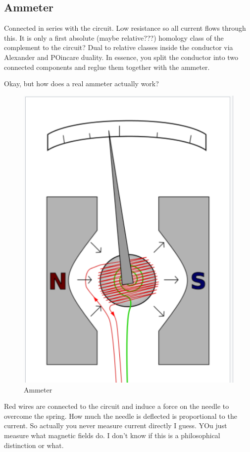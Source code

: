 \documentclass{article}
\begin{document}
\subsection{Ammeter}

Connected in series with the circuit. Low resistance so all current flows through this. It is only a first absolute (maybe relative???) homology class of the complement to the circuit? Dual to relative classes inside the conductor via Alexander and POincare duality. In essence, you split the conductor into two connected components and reglue them together with the ammeter.

Okay, but how does a real ammeter actually work? 
\begin{figure}
    \centering
    \includegraphics{figures/ammeter.png}
    \caption{Ammeter}
\end{figure}
Red wires are connected to the circuit and induce a force on the needle to overcome the spring. How much the needle is deflected is proportional to the current. So actually you never measure current directly I guess. YOu just measure what magnetic fields do. I don't know if this is a philosophical distinction or what.
\end{document}

